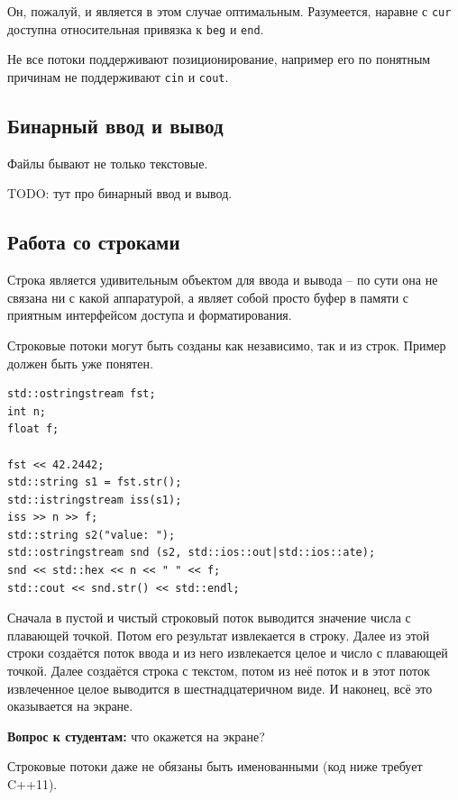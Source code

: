 \documentclass[a4paper,12pt,oneside]{book}
\newif\ifanswers
\begin{document}
Он, пожалуй, и является в этом случае оптимальным. Разумеется, наравне с \lstinline!cur! доступна относительная привязка к \lstinline!beg! и \lstinline!end!.

Не все потоки поддерживают позиционирование, например его по понятным причинам не поддерживают \lstinline!cin! и \lstinline!cout!.

\subsection{Бинарный ввод и вывод}

Файлы бывают не только текстовые. 

TODO: тут про бинарный ввод и вывод.

\subsection{Работа со строками}\label{subsub:strstream}

Строка является удивительным объектом для ввода и вывода -- по сути она не связана ни с какой аппаратурой, а являет собой просто буфер в памяти с приятным интерфейсом доступа и форматирования.

Строковые потоки могут быть созданы как независимо, так и из строк. Пример должен быть уже понятен.

\begin{lstlisting}
std::ostringstream fst;
int n;
float f;

fst << 42.2442;
std::string s1 = fst.str();
std::istringstream iss(s1);
iss >> n >> f;
std::string s2("value: ");
std::ostringstream snd (s2, std::ios::out|std::ios::ate);
snd << std::hex << n << " " << f;
std::cout << snd.str() << std::endl;
\end{lstlisting}

Сначала в пустой и чистый строковый поток выводится значение числа с плавающей точкой. Потом его результат извлекается в строку. Далее из этой строки создаётся поток ввода и из него извлекается целое и число с плавающей точкой. Далее создаётся строка с текстом, потом из неё поток и в этот поток извлеченное целое выводится в шестнадцатеричном виде. И наконец, всё это оказывается на экране.

\textbf{Вопрос к студентам:} что окажется на экране?

\ifanswers
Правильный ответ: value: 2a 0.2442
\fi

Строковые потоки даже не обязаны быть именованными (код ниже требует C++11).
\end{document}
